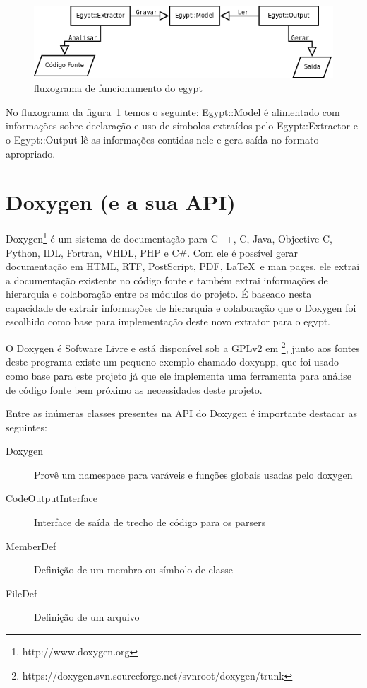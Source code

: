 \begin{figure}[h]
\center
\includegraphics[scale=0.4]{imagens/egypt-fluxogram}
\caption{fluxograma de funcionamento do egypt}
\label{egypt-fluxogram}
\end{figure}

No fluxograma da figura~\ref{egypt-fluxogram} temos o seguinte: Egypt::Model é
alimentado com informações sobre declaração e uso de símbolos extraídos pelo
Egypt::Extractor e o Egypt::Output lê as informações contidas nele e gera saída
no formato apropriado.

\section{Doxygen (e a sua API)}

Doxygen\footnote{http://www.doxygen.org} é um sistema de documentação para C++,
C, Java, Objective-C, Python, IDL, Fortran, VHDL, PHP e C\#. Com ele é possível
gerar documentação em HTML, RTF, PostScript, PDF, \LaTeX\ e man pages, ele
extrai a documentação existente no código fonte e também extrai informações de
hierarquia e colaboração entre os módulos do projeto. É baseado nesta
capacidade de extrair informações de hierarquia e colaboração que o Doxygen foi
escolhido como base para implementação deste novo extrator para o egypt.

O Doxygen é Software Livre e está disponível sob a GPLv2 em
\footnote{https://doxygen.svn.sourceforge.net/svnroot/doxygen/trunk}, junto aos
fontes deste programa existe um pequeno exemplo chamado doxyapp, que foi usado
como base para este projeto já que ele implementa uma ferramenta para análise
de código fonte bem próximo as necessidades deste projeto.

Entre as inúmeras classes presentes na API do Doxygen é importante
destacar as seguintes:

\begin{description}
\item[Doxygen] Provê um namespace para varáveis e funções globais usadas pelo doxygen
\item[CodeOutputInterface] Interface de saída de trecho de código para os parsers
\item[MemberDef] Definição de um membro ou símbolo de classe
\item[FileDef] Definição de um arquivo
\end{description}


